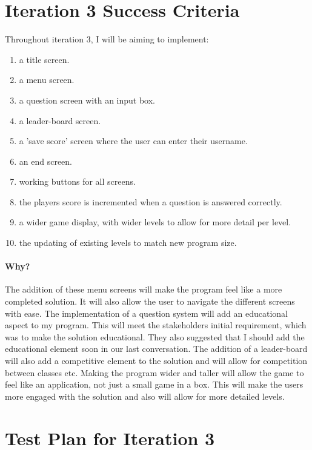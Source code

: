 \documentclass[12pt]{report}
\begin{document}
\section{Iteration 3 Success Criteria}
Throughout iteration 3, I will be aiming to implement:

\begin{enumerate}
    \item a title screen.
    \item a menu screen. 
    \item a question screen with an input box.
    \item a leader-board screen.
    \item a 'save score' screen where the user can enter their username.
    \item an end screen.
    \item working buttons for all screens.
    \item the players score is incremented when a question is answered correctly.
    \item a wider game display, with wider levels to allow for more detail per level.
    \item the updating of existing levels to match new program size.
\end{enumerate}

\paragraph{Why?}
The addition of these menu screens will make the program feel like a more completed solution. It will also allow the user to navigate the different screens with ease. The implementation of a question system will add an educational aspect to my program. This will meet the stakeholders initial requirement, which was to make the solution educational. They also suggested that I should add the educational element soon in our last conversation. The addition of a leader-board will also add a competitive element to the solution and will allow for competition between classes etc. Making the program wider and taller will allow the game to feel like an application, not just a small game in a box. This will make the users more engaged with the solution and also will allow for more detailed levels. 

\pagebreak

\section{Test Plan for Iteration 3}
\end{document}
